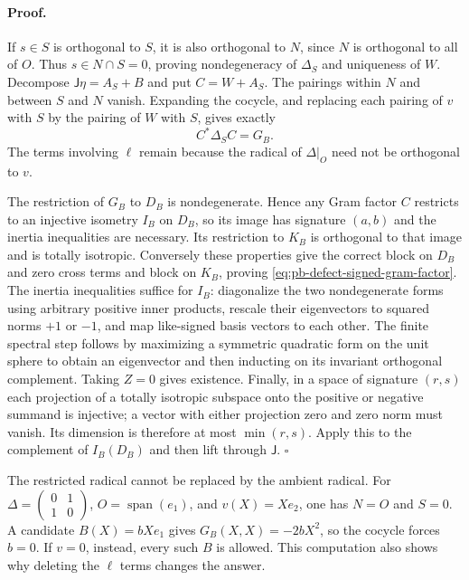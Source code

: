 \paragraph{Proof.}
If $s\in S$ is orthogonal to $S$, it is also orthogonal to $N$, since
$N$ is orthogonal to all of $O$. Thus $s\in N\cap S=0$, proving
nondegeneracy of $\Delta_S$ and uniqueness of $W$.
Decompose $\mathsf J\eta=A_S+B$ and put $C=W+A_S$.
The pairings within $N$ and between $S$ and $N$ vanish. Expanding the cocycle,
and replacing each pairing of $v$ with $S$ by the pairing of $W$ with
$S$, gives exactly
\begin{equation}
C^*\Delta_SC=G_B.
\label{eq:pb-defect-signed-gram-factor}
\end{equation}
The terms involving $\ell$ remain because the radical of $\Delta|_O$
need not be orthogonal to $v$.

The restriction of $G_B$ to $D_B$ is nondegenerate. Hence any Gram
factor $C$ restricts to an injective isometry $I_B$ on $D_B$, so its
image has signature $(a,b)$ and the inertia inequalities are necessary.
Its restriction to $K_B$ is orthogonal to that image and is totally
isotropic. Conversely these properties give the correct block on $D_B$
and zero cross terms and block on $K_B$, proving
\eqref{eq:pb-defect-signed-gram-factor}. The inertia inequalities
suffice for $I_B$: diagonalize the two nondegenerate forms using
arbitrary positive inner products, rescale their eigenvectors to
squared norms $+1$ or $-1$, and map like-signed basis vectors to each
other. The finite spectral step follows by maximizing a symmetric
quadratic form on the unit sphere to obtain an eigenvector and then
inducting on its invariant orthogonal complement. Taking $Z=0$ gives
existence. Finally, in a space of signature $(r,s)$ each projection of
a totally isotropic subspace onto the positive or negative summand is
injective; a vector with either projection zero and zero norm must
vanish. Its dimension is therefore at most $\min(r,s)$. Apply this to
the complement of $I_B(D_B)$ and then lift through $\mathsf J$.
$\square$

The restricted radical cannot be replaced by the ambient radical.
For $\Delta=\left(\begin{smallmatrix}0&1\\1&0\end{smallmatrix}\right)$,
$O=\operatorname{span}(e_1)$, and $v(X)=Xe_2$, one has $N=O$ and $S=0$.
A candidate $B(X)=bXe_1$ gives $G_B(X,X)=-2bX^2$, so the cocycle forces
$b=0$. If $v=0$, instead, every such $B$ is allowed. This computation
also shows why deleting the $\ell$ terms changes the answer.

